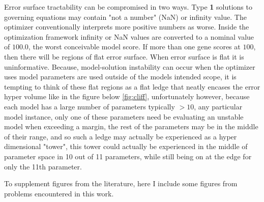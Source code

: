 Error surface tractability can be compromised in two ways.
Type \textbf{1} solutions to governing equations may contain "not a number" (NaN) or infinity value. The optimizer conventionally interprets more positive numbers as worse. Inside the optimization framework infinity or NaN values are converted to a nominal value of $100.0$, the worst conceivable model score. If more than one gene scores at $100$, then there will be regions of flat error surface. %
When error surface is flat it is uninformative. 
Because, model-solution instability can occur when the optimizer uses model parameters are used outside of the models intended scope, it is tempting to think of these flat regions as a flat ledge that neatly encases the error hyper volume like in the figure below \ref{fig:cliff}, unfortunately however, because each model has a large number of parameters typically $>10$, any particular model instance, only one of these parameters need be evaluating an unstable model when exceeding a margin, the rest of the parameters may be in the middle of their range, and so such a ledge may actually be experienced as a hyper dimensional "tower", this tower could actually be experienced in the middle of parameter space in 10 out of 11 parameters, while still being on at the edge for only the 11th parameter.


To supplement figures from the literature, here I include some figures from problems encountered in this work.


